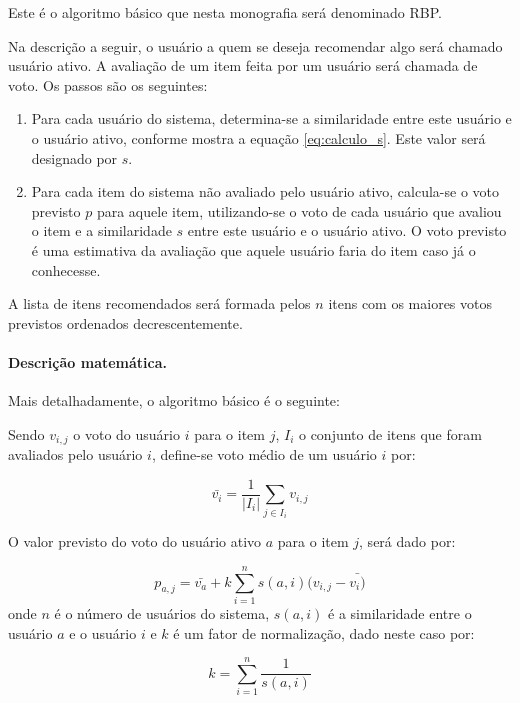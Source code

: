 Este é o algoritmo básico que nesta monografia será denominado RBP.

Na descrição a seguir, o usuário a quem se deseja recomendar algo será chamado usuário ativo. A avaliação de um item feita por um usuário será chamada de voto. Os passos são os seguintes:

\begin{enumerate}
\item 
Para cada usuário do sistema, determina-se a similaridade entre este usuário e o usuário ativo, conforme mostra a equação \ref{eq:calculo_s}. Este valor será designado por $s$.

\item Para cada item do sistema não avaliado pelo usuário ativo, calcula-se o voto previsto $p$ para aquele item, utilizando-se o voto de cada usuário que avaliou o item e a similaridade $s$ entre este usuário e o usuário ativo. O voto previsto é uma estimativa da avaliação que aquele usuário faria do item caso já o conhecesse.
\end{enumerate}

A lista de itens recomendados será formada pelos $n$ itens com os maiores votos previstos ordenados decrescentemente.

\paragraph{Descrição matemática.}

Mais detalhadamente, o algoritmo básico é o seguinte:

Sendo $v_{i,j}$ o voto do usuário $i$ para o item $j$, $I_{i}$ o conjunto de itens que foram avaliados pelo usuário $i$, define-se voto médio de um usuário $i$ por:

\begin{equation}
 \bar{v_{i}} = \frac{1}{|I_{i}|} \sum_{j \in I_{i}} v_{i,j}
\end{equation}

O valor previsto do voto do usuário ativo $a$ para o item $j$, será dado por:

\begin{equation}
 p_{a,j} = \bar{v_{a}} + k\sum_{i=1}^n{s(a,i) (v_{i,j} - \bar{v_{i})}}
 \label{eq:filtragem_colaborativa_similaridade} 
\end{equation}
onde $n$ é o número de usuários do sistema, $s(a,i)$ é a similaridade entre o usuário $a$ e o usuário $i$ e $k$ é um fator de normalização, dado neste caso por:

\begin{equation}
 k = \sum_{i=1}^n{\frac{1}{s(a,i)}}
\end{equation}


